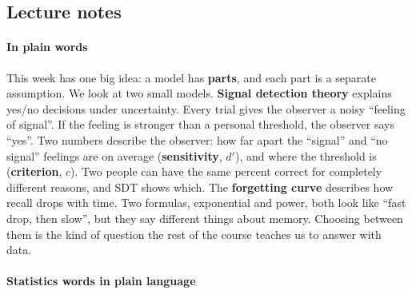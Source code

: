 
\subsection{Lecture notes}

\paragraph{In plain words}

This week has one big idea: a model has \textbf{parts}, and each part is
a separate assumption. We look at two small models. \textbf{Signal
detection theory} explains yes/no decisions under uncertainty. Every
trial gives the observer a noisy ``feeling of signal''. If the feeling
is stronger than a personal threshold, the observer says ``yes''. Two
numbers describe the observer: how far apart the ``signal'' and ``no
signal'' feelings are on average (\textbf{sensitivity}, \(d'\)), and
where the threshold is (\textbf{criterion}, \(c\)). Two people can have
the same percent correct for completely different reasons, and SDT shows
which. The \textbf{forgetting curve} describes how recall drops with
time. Two formulas, exponential and power, both look like ``fast drop,
then slow'', but they say different things about memory. Choosing
between them is the kind of question the rest of the course teaches us
to answer with data.

\paragraph{Statistics words in plain language}

